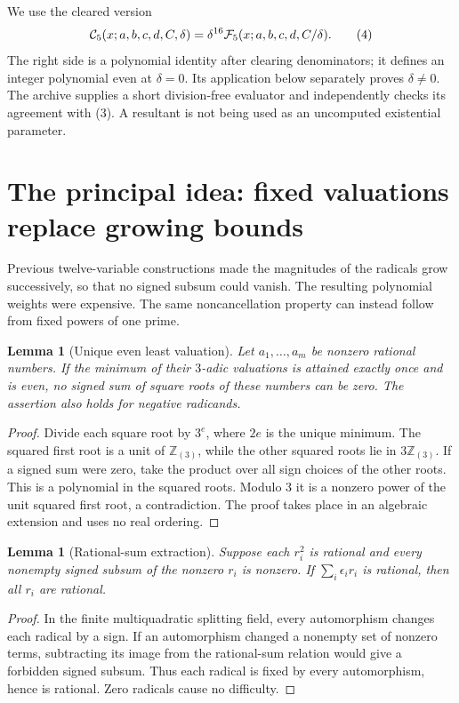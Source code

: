 \documentclass[11pt,letterpaper]{article}
\newtheorem{lemma}[theorem]{Lemma}
\theoremstyle{definition}\newtheorem{definition}[theorem]{Definition}
\theoremstyle{remark}\newtheorem{remark}[theorem]{Remark}
\newcommand{\Z}{\mathbb Z}\newcommand{\N}{\mathbb N}\newcommand{\Q}{\mathbb Q}
\begin{document}
We use the cleared version
\[
 \mathcal C_5(x;a,b,c,d,C,\delta)
 =\delta^{16}\mathcal F_5(x;a,b,c,d,C/\delta).
 \tag{4}\label{eq:cleared}
\]
The right side is a polynomial identity after clearing denominators; it defines an integer polynomial even at $\delta=0$. Its application below separately proves $\delta\ne0$. The archive supplies a short division-free evaluator and independently checks its agreement with (3). A resultant is not being used as an uncomputed existential parameter.

\section{The principal idea: fixed valuations replace growing bounds}
Previous twelve-variable constructions made the magnitudes of the radicals grow successively, so that no signed subsum could vanish. The resulting polynomial weights were expensive. The same noncancellation property can instead follow from fixed powers of one prime.

\begin{lemma}[Unique even least valuation]\label{lem:valuation}
Let $a_1,\ldots,a_m$ be nonzero rational numbers. If the minimum of their $3$-adic valuations is attained exactly once and is even, no signed sum of square roots of these numbers can be zero. The assertion also holds for negative radicands.
\end{lemma}
\begin{proof}
Divide each square root by $3^e$, where $2e$ is the unique minimum. The squared first root is a unit of $\Z_{(3)}$, while the other squared roots lie in $3\Z_{(3)}$. If a signed sum were zero, take the product over all sign choices of the other roots. This is a polynomial in the squared roots. Modulo $3$ it is a nonzero power of the unit squared first root, a contradiction. The proof takes place in an algebraic extension and uses no real ordering.
\end{proof}

\begin{lemma}[Rational-sum extraction]\label{lem:extraction}
Suppose each $r_i^2$ is rational and every nonempty signed subsum of the nonzero $r_i$ is nonzero. If $\sum_i\epsilon_i r_i$ is rational, then all $r_i$ are rational.
\end{lemma}
\begin{proof}
In the finite multiquadratic splitting field, every automorphism changes each radical by a sign. If an automorphism changed a nonempty set of nonzero terms, subtracting its image from the rational-sum relation would give a forbidden signed subsum. Thus each radical is fixed by every automorphism, hence is rational. Zero radicals cause no difficulty.
\end{proof}
\end{document}
